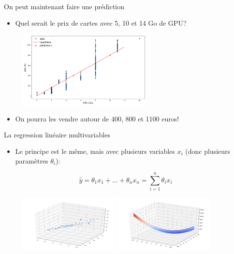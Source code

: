 \documentclass[aspectratio=169, 11pt]{beamer}
\begin{document}
\begin{frame}{On peut maintenant faire une prédiction}
  \begin{itemize}
  \item Quel serait le prix de cartes avec 5, 10 et 14 Go de GPU? 
  \end{itemize}
  \vspace{-0.2cm}
  \begin{figure}
    \includegraphics[width=0.6\textwidth]{figs/pred.png}
  \end{figure}
  \vspace{-0.5cm}
  \begin{itemize}
  \item On pourra les vendre autour de 400, 800 et 1100 euros!
  \end{itemize} 
\end{frame}

\begin{frame}{La regression linéaire multivariables}
  \begin{itemize}
    \item Le principe est le même, mais avec plusieurs variables $x_{i}$ (donc plusieurs paramètres $\theta_{i}$):
  \end{itemize}
    \begin{equation*}
      \hat{y} = \theta_{1}x_{1} + \dots + \theta_{n}x_{n} = \displaystyle\sum_{i=1}^{n} \theta_{i} x_{i}
    \end{equation*}
  \begin{figure}
    \includegraphics[width=0.45\textwidth]{figs/multiVarData.png}
    \includegraphics[width=0.45\textwidth]{figs/multiVarCostFct.png}\\
  \end{figure}
\end{frame}
\end{document}
